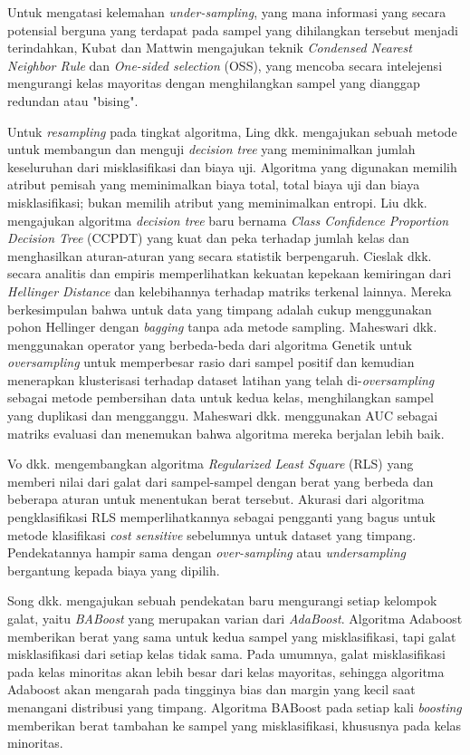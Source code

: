 \documentclass[12pt,a4paper,titlepage]{article}
\begin{document}
Untuk mengatasi kelemahan \textit{under-sampling}, yang mana informasi yang secara potensial berguna yang terdapat pada sampel yang dihilangkan tersebut menjadi terindahkan, Kubat dan Mattwin \cite{kubat1997addressing} mengajukan teknik \textit{Condensed Nearest Neighbor Rule} dan \textit{One-sided selection} (OSS), yang mencoba secara intelejensi mengurangi kelas mayoritas dengan menghilangkan sampel yang dianggap redundan atau "bising".

Untuk \textit{resampling} pada tingkat algoritma, Ling dkk. \cite{ling2004decision} mengajukan sebuah metode untuk membangun dan menguji \textit{decision tree} yang meminimalkan jumlah keseluruhan dari misklasifikasi dan biaya uji.
Algoritma yang digunakan memilih atribut pemisah yang meminimalkan biaya total, total biaya uji dan biaya misklasifikasi; bukan memilih atribut yang meminimalkan entropi.
Liu dkk. \cite{liu2010robust} mengajukan algoritma \textit{decision tree} baru bernama \textit{Class Confidence Proportion Decision Tree} (CCPDT) yang kuat dan peka terhadap jumlah kelas dan menghasilkan aturan-aturan yang secara statistik berpengaruh.
Cieslak dkk. \cite{cieslak2012hellinger} secara analitis dan empiris memperlihatkan kekuatan kepekaan kemiringan dari \textit{Hellinger Distance} dan kelebihannya terhadap matriks terkenal lainnya.
Mereka berkesimpulan bahwa untuk data yang timpang adalah cukup menggunakan pohon Hellinger dengan \textit{bagging} tanpa ada metode sampling.
Maheswari dkk. \cite{maheshwari2011new} menggunakan operator yang berbeda-beda dari algoritma Genetik untuk \textit{oversampling} untuk memperbesar rasio dari sampel positif dan kemudian menerapkan klusterisasi terhadap dataset latihan yang telah di-\textit{oversampling} sebagai metode pembersihan data untuk kedua kelas, menghilangkan sampel yang duplikasi dan mengganggu.
Maheswari dkk. menggunakan AUC sebagai matriks evaluasi dan menemukan bahwa algoritma mereka berjalan lebih baik.

Vo dkk. \cite{vo2007classification} mengembangkan algoritma \textit{Regularized Least Square} (RLS) yang memberi nilai dari galat dari sampel-sampel dengan berat yang berbeda dan beberapa aturan untuk menentukan berat tersebut.
Akurasi dari algoritma pengklasifikasi RLS memperlihatkannya sebagai pengganti yang bagus untuk metode klasifikasi \textit{cost sensitive} sebelumnya untuk dataset yang timpang.
Pendekatannya hampir sama dengan \textit{over-sampling} atau \textit{undersampling} bergantung kepada biaya yang dipilih.

Song dkk. \cite{song2009improved} mengajukan sebuah pendekatan baru mengurangi setiap kelompok galat, yaitu \textit{BABoost} yang merupakan varian dari \textit{AdaBoost}.
Algoritma Adaboost memberikan berat yang sama untuk kedua sampel yang misklasifikasi, tapi galat misklasifikasi dari setiap kelas tidak sama.
Pada umumnya, galat misklasifikasi pada kelas minoritas akan lebih besar dari kelas mayoritas, sehingga algoritma Adaboost akan mengarah pada tingginya bias dan margin yang kecil saat menangani distribusi yang timpang.
Algoritma BABoost pada setiap kali \textit{boosting} memberikan berat tambahan ke sampel yang misklasifikasi, khususnya pada kelas minoritas.
\end{document}
